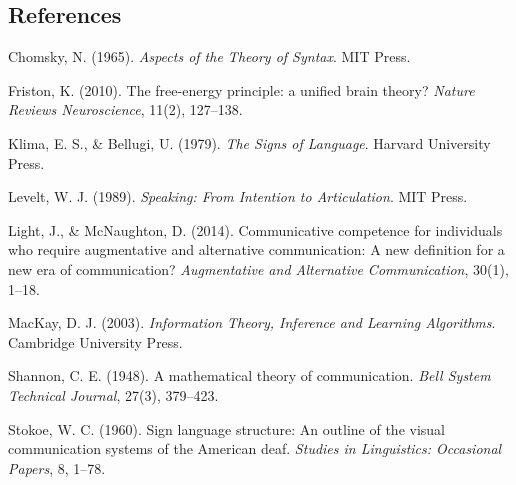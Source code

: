 \documentclass[11pt,letterpaper]{article}
\begin{document}
\subsection*{References}
{\footnotesize
\begin{enumerate}[label={[\arabic*]},noitemsep,topsep=1pt,itemsep=1pt]
    \item Chomsky, N. (1965). \textit{Aspects of the Theory of Syntax}. MIT Press.
    \item Friston, K. (2010). The free-energy principle: a unified brain theory? \textit{Nature Reviews Neuroscience}, 11(2), 127--138.
    \item Klima, E. S., \& Bellugi, U. (1979). \textit{The Signs of Language}. Harvard University Press.
    \item Levelt, W. J. (1989). \textit{Speaking: From Intention to Articulation}. MIT Press.
    \item Light, J., \& McNaughton, D. (2014). Communicative competence for individuals who require augmentative and alternative communication: A new definition for a new era of communication? \textit{Augmentative and Alternative Communication}, 30(1), 1--18.
    \item MacKay, D. J. (2003). \textit{Information Theory, Inference and Learning Algorithms}. Cambridge University Press.
    \item Shannon, C. E. (1948). A mathematical theory of communication. \textit{Bell System Technical Journal}, 27(3), 379--423.
    \item Stokoe, W. C. (1960). Sign language structure: An outline of the visual communication systems of the American deaf. \textit{Studies in Linguistics: Occasional Papers}, 8, 1--78.
\end{enumerate}
}
\end{document}
